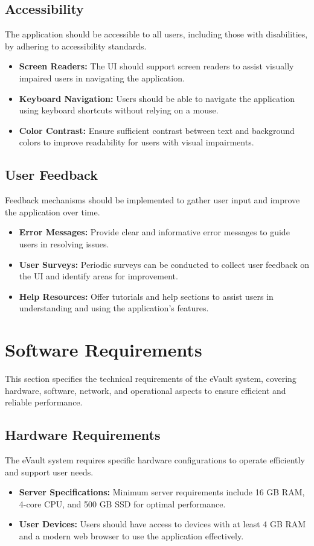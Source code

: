 \documentclass[12pt,a4paper]{report}
\begin{document}
   \subsection{Accessibility}
   The application should be accessible to all users, including those with disabilities, by adhering to accessibility standards.
   \begin{itemize}
       \item \textbf{Screen Readers:} The UI should support screen readers to assist visually impaired users in navigating the application.
       \item \textbf{Keyboard Navigation:} Users should be able to navigate the application using keyboard shortcuts without relying on a mouse.
       \item \textbf{Color Contrast:} Ensure sufficient contrast between text and background colors to improve readability for users with visual impairments.
   \end{itemize}
   
   \subsection{User Feedback}
   Feedback mechanisms should be implemented to gather user input and improve the application over time.
   \begin{itemize}
       \item \textbf{Error Messages:} Provide clear and informative error messages to guide users in resolving issues.
       \item \textbf{User Surveys:} Periodic surveys can be conducted to collect user feedback on the UI and identify areas for improvement.
       \item \textbf{Help Resources:} Offer tutorials and help sections to assist users in understanding and using the application's features.
   \end{itemize}
   
   \section{Software Requirements}
   
   This section specifies the technical requirements of the eVault system, covering hardware, software, network, and operational aspects to ensure efficient and reliable performance.
   
   \subsection{Hardware Requirements}
   The eVault system requires specific hardware configurations to operate efficiently and support user needs.
   \begin{itemize}
       \item \textbf{Server Specifications:} Minimum server requirements include 16 GB RAM, 4-core CPU, and 500 GB SSD for optimal performance.
       \item \textbf{User Devices:} Users should have access to devices with at least 4 GB RAM and a modern web browser to use the application effectively.
   \end{itemize}
   
\end{document}
